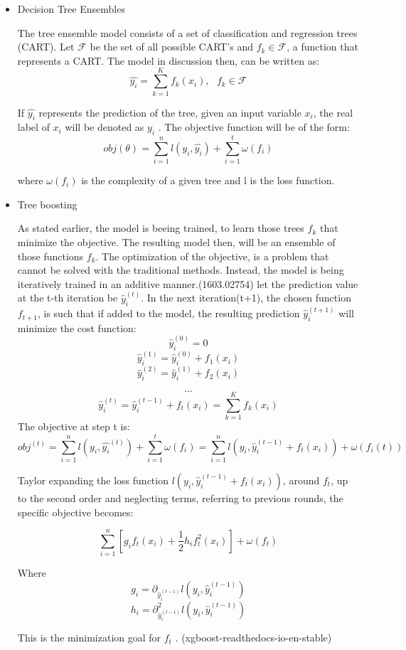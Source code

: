 \documentclass[11pt,a4paper]{article}
\begin{document}
\begin{itemize}
\item Decision Tree Ensembles
\label{sec:orgcad9c82}

The tree ensemble model consists of a set of classification and regression trees (CART).
Let \(\mathcal{F}\) be the set of all possible CART's and \(f_{k} \in \mathcal{F}\), a function that represents a CART. The model in discussion then, can be written as:
\[
\hat{y_{i}} = \sum_{k=1}^{K} f_{k}(x_{i}),\text{ } f_{k} \in \mathcal{F}
\]

If \(\hat{y_{i}}\) represents the prediction of the tree, given an input variable \(x_{i}\), the real label of \(x_{i}\) will be denoted as \(y_{i}\)  . The objective function will be of the form:
\[
obj(\theta) = \sum_{i=1}^{n} l(y_{i}, \hat{y_{i}}) + \sum_{i=1}^{t}\omega(f_{i})
\]

where \(\omega(f_{i})\) is the complexity of a given tree  and l is the loss function.

\item Tree boosting
\label{sec:orgcb9b2ba}

As stated earlier, the model is beeing trained, to learn those trees \(f_{k}\) that minimize the objective. The resulting model then, will be an ensemble of those functions \(f_{k}\).
The optimization of the objective, is a problem that cannot be solved with the traditional methods. Instead, the model is being iteratively trained in an additive manner.(1603.02754)
let the prediction value at the t-th iteration be \(\hat{y}^{(t)}_{i}\). In the next iteration(t+1), the chosen function \(f_{t+1}\), is such that if added to the model, the resulting prediction \(\hat{y}^{(t+1)}_{i}\) will minimize the cost function:
\[
\hat{y}^{(0)}_{i} = 0 \]
\[
\hat{y}^{(1)}_{i} =\hat{y}^{(0)}_{i} + f_{1}(x_{i}) 
\]
\[
\hat{y}^{(2)}_{i} =\hat{y}^{(1)}_{i} + f_{2}(x_{i}) 
\]

\[
\dots
\]
\[
\hat{y}_{i}^{(t)} = \hat{y}_{i}^{(t-1)} + f_{t}(x_{i})= \sum_{k=1}^{K} f_{k}(x_{i})
\]
The objective at step t is:
\[
obj^{(t)} = \sum_{i=1}^{n} l(y_{i}, \hat{y_{i}}^{(t)}) + \sum_{i=1}^{t}\omega(f_{i}) = \sum _{i=1}^{n} l(y_{i}, \hat{y}_{i}^{(t-1)} + f_{t}(x_{i})) + \omega(f_{i}(t))
\]

Taylor expanding the loss function \(l(y_{i}, \hat{y}_{i}^{(t-1)} + f_{t}(x_{i}))\), around \(f_{t}\), up to the second order and neglecting terms, referring to previous rounds, the specific objective becomes:

\[
\sum_{i=1}^{n}\left [ g_{i}f_{t}(x_{i})+\frac{1}{2}h_{i}f^{2}_{t} (x_{i}) \right ] + \omega(f_{t})
\]

Where
\[
g_{i} = \partial_{\hat{y}_{i}^{(t-1) }} l(y_{i}, \hat{y}_{i}^{(t-1)} )
\]
\[
h_{i} = \partial^{2}_{\hat{y}_{i}^{(t-1) }} l(y_{i}, \hat{y}_{i}^{(t-1)} )
\]

This is the minimization goal for \(f_{t}\) . (xgboost-readthedocs-io-en-stable)
\end{itemize}
\end{document}

